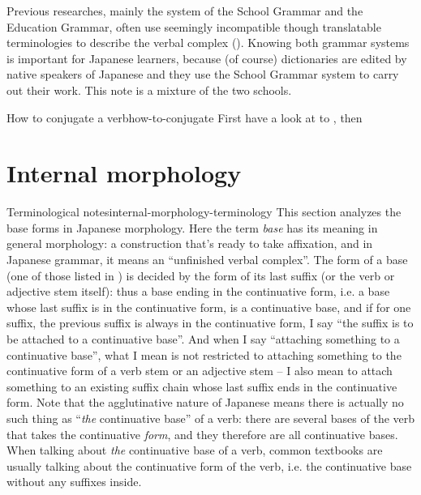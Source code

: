 \documentclass[UTF8, a4paper, oneside, scheme=plain]{ctexrep}
\newcommand*{\term}[1]{\emph{#1}}
\begin{document}
Previous researches, mainly the system of the School Grammar and the Education Grammar,
often use seemingly incompatible though translatable terminologies 
to describe the verbal complex ().
Knowing both grammar systems is important for Japanese learners,
because (of course) dictionaries are edited by native speakers of Japanese
and they use the School Grammar system to carry out their work.
This note is a mixture of the two schools.

\begin{learnbox}{How to conjugate a verb}{how-to-conjugate}
    First have a look at  to ,
    then 
\end{learnbox}

\section{Internal morphology}\label{sec:conjugation-class}

\begin{theorybox}{Terminological notes}{internal-morphology-terminology}
    This section analyzes the base forms in Japanese morphology.
    Here the term \term{base} has its meaning in general morphology:
    a construction that's ready to take affixation,
    and in Japanese grammar, it means an ``unfinished verbal complex''.
    The form of a base (one of those listed in ) 
    is decided by the form of its last suffix 
    (or the verb or adjective stem itself):
    thus a base ending in the continuative form, 
    i.e. a base whose last suffix is in the continuative form,
    is a continuative base,
    and if for one suffix, the previous suffix is always in the continuative form,
    I say ``the suffix is to be attached to a continuative base''.
    And when I say ``attaching something to a continuative base'',
    what I mean is not restricted to 
    attaching something to the continuative form of a verb stem or an adjective stem 
    -- I also mean to attach something to an existing suffix chain 
    whose last suffix ends in the continuative form.
    Note that the agglutinative nature of Japanese means 
    there is actually no such thing as 
    ``\emph{the} continuative base'' of a verb:
    there are several bases of the verb that takes the continuative \emph{form},
    and they therefore are all continuative bases.
    When talking about \emph{the} continuative base of a verb,
    common textbooks are usually talking about the continuative form of the verb,
    i.e. the continuative base without any suffixes inside.
\end{theorybox}
\end{document}
